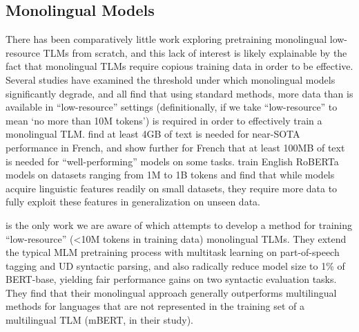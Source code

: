 \documentclass[11pt]{article}
\begin{document}
\subsection{Monolingual Models}
There has been comparatively little work exploring pretraining monolingual low-resource TLMs from scratch, and this lack of interest is likely explainable by the fact that monolingual TLMs require copious training data in order to be effective.
Several studies have examined the threshold under which monolingual models significantly degrade, and all find that using standard methods, more data than is available in ``low-resource'' settings (definitionally, if we take ``low-resource'' to mean `no more than 10M tokens') is required in order to effectively train a monolingual TLM.
 find at least 4GB of text is needed for near-SOTA performance in French, and \citet{micheli_importance_2020} show further for French that at least 100MB of text is needed for ``well-performing'' models on some tasks. 
 train English RoBERTa models on datasets ranging from 1M to 1B tokens and find that while models acquire linguistic features readily on small datasets, they require more data to fully exploit these features in generalization on unseen data.

\citet{gessler-zeldes-2022-microbert} is the only work we are aware of which attempts to develop a method for training ``low-resource'' (<10M tokens in training data) monolingual TLMs.
They extend the typical MLM pretraining process with multitask learning on part-of-speech tagging and UD syntactic parsing, and also radically reduce model size to 1\% of BERT-base, yielding fair performance gains on two syntactic evaluation tasks.
They find that their monolingual approach generally outperforms multilingual methods for languages that are not represented in the training set of a multilingual TLM (mBERT, in their study).
\end{document}

